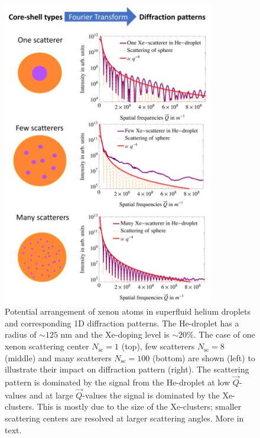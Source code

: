 \begin{figure}
 	\centering
 		\includegraphics[width=0.82\textwidth]{images/results/plum-pudding.png}
 	\caption[Potential arrangement of Xe-clusters within He-droplets.]{Potential arrangement of xenon atoms in superfluid helium droplets and corresponding 1D diffraction patterns. The He-droplet has a radius of $\sim 125$ nm and the Xe-doping level is $\sim 20\%$. The case of one xenon scattering center $N_{\text{sc}}=1$ (top), few scatterers $N_{\text{sc}}=8$ (middle) and many scatterers $N_{\text{sc}}=100$ (bottom) are shown (left) to illustrate their impact on diffraction pattern (right). The scattering pattern is dominated by the signal from the He-droplet at low $\vec{Q}$-values and at large $\vec{Q}$-values the signal is dominated by the Xe-clusters. This is mostly due to the size of the Xe-clusters; smaller scattering centers are resolved at larger scattering angles. More in text.}
 	\label{fig:HeXe-plum-pudding}
\end{figure}

